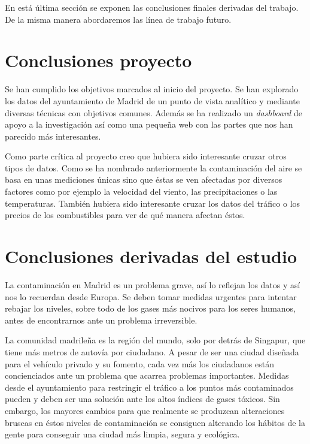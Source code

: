 
En está última sección se exponen las conclusiones finales derivadas del trabajo. De la misma manera abordaremos las línea de trabajo futuro.


\section{Conclusiones proyecto}\label{conclusiones_proyecto}
Se han cumplido los objetivos marcados al inicio del proyecto. Se han explorado los datos del ayuntamiento de Madrid de un punto de vista analítico y mediante diversas técnicas con objetivos comunes. Además se ha realizado un \textit{dashboard} de apoyo a la investigación así como una pequeña web con las partes que nos han parecido más interesantes.

Como parte crítica al proyecto creo que hubiera sido interesante cruzar otros tipos de datos. Como se ha nombrado  anteriormente la contaminación del aire se basa en unas mediciones únicas sino que éstas se ven afectadas por diversos factores como por ejemplo la velocidad del viento, las precipitaciones o las temperaturas. También hubiera sido interesante cruzar los datos del tráfico o los precios de los combustibles para ver de qué manera afectan éstos.


\section{Conclusiones derivadas del estudio}\label{conclusiones_proyecto}
La contaminación en Madrid es un problema grave, así lo reflejan los datos y así nos lo recuerdan desde Europa. Se deben tomar medidas urgentes para intentar rebajar los niveles, sobre todo de los gases más nocivos para los seres humanos, antes de encontrarnos ante un problema irreversible.

La comunidad madrileña es la región del mundo, solo por detrás de Singapur, que tiene más metros de autovía por ciudadano. A pesar de ser una ciudad diseñada para el vehículo privado y su fomento, cada vez más los ciudadanos están concienciados ante un problema que acarrea problemas importantes. Medidas desde el ayuntamiento para restringir el tráfico a los puntos más contaminados pueden y deben ser una solución ante los altos índices de gases tóxicos. Sin embargo, los mayores cambios para que realmente se produzcan alteraciones bruscas en éstos niveles de contaminación se consiguen alterando los hábitos de la gente para conseguir una ciudad más limpia, segura y ecológica.

